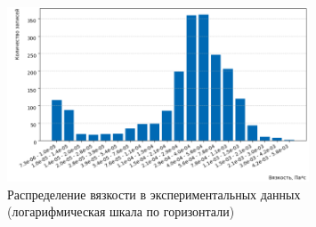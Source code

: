 \documentclass[a4paper,12pt]{article}
\begin{document}
      \begin{figure}[ht!]
          \centering
          \includegraphics[width=0.8\textwidth]{data_distribution_viscosity.png}
          \caption{Распределение вязкости в экспериментальных данных (логарифмическая шкала по горизонтали)}
          \label{fig:data_distribution_viscosity}
      \end{figure}
\end{document}
